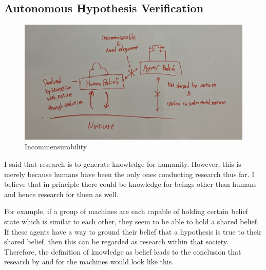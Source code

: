 \documentclass{article}
\begin{document}

\subsection{Autonomous Hypothesis Verification}

\begin{figure}[htb]
    \centering
    \includegraphics[width=\linewidth]{figs/incommensurability.jpg}
    \caption{Incommensurability}
    \label{fig:incommensurability}
\end{figure}

I said that research is to generate knowledge for humanity. However, this is merely because humans have been the only ones conducting research thus far. I believe that in principle there could be knowledge for beings other than humans and hence research for them as well. 

For example, if a group of machines are each capable of holding certain belief state which is similar to each other, they seem to be able to hold a shared belief. If these agents have a way to ground their belief that a hypothesis is true to their shared belief, then this can be regarded as research within that society. Therefore, the definition of knowledge as belief leads to the conclusion that research by and for the machines would look like this.
\end{document}
